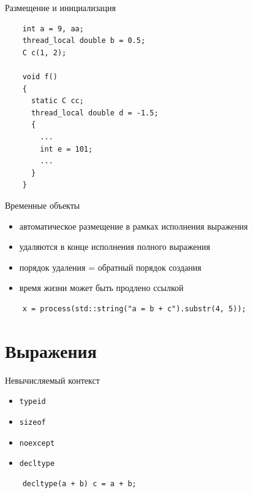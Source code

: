 \documentclass[unknownkeysallowed,xcolor=table]{beamer}
\begin{document}
\begin{frame}[fragile]{Размещение и инициализация}
  \begin{lstlisting}
    int a = 9, aa;
    thread_local double b = 0.5;
    C c(1, 2);

    void f()
    {
      static C cc;
      thread_local double d = -1.5;
      {
        ...
        int e = 101;
        ...
      }
    }
  \end{lstlisting}
\end{frame}

\begin{frame}[fragile]{Временные объекты}
  \begin{itemize}
    \item автоматическое размещение в рамках исполнения выражения \vspace{0.5em}
    \item удаляются в конце исполнения полного выражения \vspace{0.5em}
    \item порядок удаления = обратный порядок создания \vspace{0.5em}
    \item время жизни может быть продлено ссылкой
  \end{itemize}

  \vspace{1em}

  \begin{lstlisting}
    x = process(std::string("a = b + c").substr(4, 5));
  \end{lstlisting}
\end{frame}

\section{Выражения}

\begin{frame}[fragile]{Невычисляемый контекст}
  \begin{itemize}
    \item \lstinline{typeid} \vspace{1em}
    \item \lstinline{sizeof} \vspace{1em}
    \item \lstinline{noexcept} \vspace{1em}
    \item \lstinline{decltype}
  \end{itemize}
  \begin{lstlisting}
    decltype(a + b) c = a + b;
  \end{lstlisting}
\end{frame}
\end{document}
